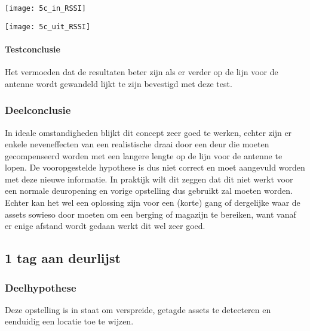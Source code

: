 \begin{minipage}{0.42\textwidth}
	\texttt{[image: 5c\_in\_RSSI]}
	\label{fig:ond-rfid-static-5cin-res}
\end{minipage}
\hfill
\begin{minipage}{0.42\textwidth}
	\texttt{[image: 5c\_uit\_RSSI]}
	\label{fig:ond-rfid-static-5cuit-res}
\end{minipage}

\paragraph{Testconclusie}
Het vermoeden dat de resultaten beter zijn als er verder op de lijn voor de antenne wordt gewandeld lijkt te zijn bevestigd met deze test.

\subsubsection{Deelconclusie}
In ideale omstandigheden blijkt dit concept zeer goed te werken, echter zijn er enkele neveneffecten van een realistische draai door een deur die moeten gecompenseerd worden met een langere lengte op de lijn voor de antenne te lopen. De vooropgestelde hypothese is dus niet correct en moet aangevuld worden met deze nieuwe informatie. In praktijk wilt dit zeggen dat dit niet werkt voor een normale deuropening en vorige opstelling dus gebruikt zal moeten worden. Echter kan het wel een oplossing zijn voor een (korte) gang of dergelijke waar de assets sowieso door moeten om een berging of magazijn te bereiken, want vanaf er enige afstand wordt gedaan werkt dit wel zeer goed. 

\subsection{1 tag aan deurlijst}
\subsubsection{Deelhypothese}
Deze opstelling is in staat om verspreide, getagde assets te detecteren en eenduidig een locatie toe te wijzen.

